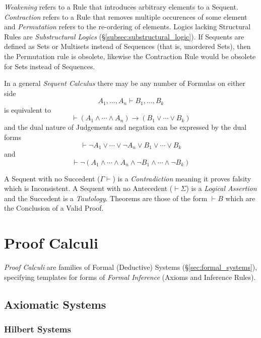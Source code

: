 \documentclass{article}
\begin{document}
\emph{Weakening} refers to a Rule that introduces arbitrary elements
to a Sequent. \emph{Contraction} refers to a Rule that removes
multiple occurences of some element and \emph{Permutation} refers to
the re-ordering of elements. Logics lacking Structural Rules are
\emph{Substructural Logics} (\S\ref{subsec:substructural_logic}). If
Sequents are defined as Sets or Multisets instead of Sequences (that
is, unordered Sets), then the Permutation rule is obsolete, likewise
the Contraction Rule would be obsolete for Sets instead of Sequences.

In a general \emph{Sequent Calculus} there may be any
number of Formulas on either side
\[
    A_1, \ldots, A_n \vdash B_1, \ldots, B_k
\]
is equivalent to
\[
    \vdash(A_1 \wedge \cdots \wedge A_n) \rightarrow (B_1 \vee \cdots \vee B_k)
\]
and the dual nature of Judgements and negation can be expressed by the
dual forms
\[
    \vdash \neg A_1 \vee \cdots \vee \neg A_n \vee B_1 \vee \cdots
    \vee B_k
\]
and
\[
    \vdash \neg(A_1 \wedge \cdots \wedge A_n \wedge \neg B_1 \wedge
    \cdots \wedge \neg B_k)
\]

A Sequent with no Succedent ($\Gamma \vdash$) is a
\emph{Contradiction} meaning it proves falsity which is
Inconsistent. A Sequent with no Antecedent ($\vdash \Sigma$) is a
\emph{Logical Assertion} and the Succedent is a
\emph{Tautology}. Theorems are those of the form $\vdash B$ which are
the Conclusion of a Valid Proof.



\section{Proof Calculi}

\emph{Proof Calculi} are families of Formal (Deductive) Systems
(\S\ref{sec:formal_systems}), specifying templates for forms of
\emph{Formal Inference} (Axioms and Inference Rules).

\subsection{Axiomatic Systems}

\subsubsection{Hilbert Systems} \label{subsec:hilbert_systems}
\end{document}
